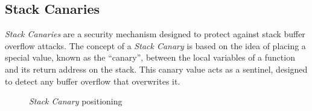 \subsection{Stack Canaries}
\label{subsec:background_canaries}

\textit{Stack Canaries} are a security mechanism designed to protect against
stack buffer overflow attacks. The concept of a \textit{Stack Canary} is based
on the idea of placing a special value, known as the ``canary'', between the
local variables of a function and its return address on the stack. This canary value
acts as a sentinel, designed to detect any buffer overflow that overwrites it.

\begin{figure}
  \centering
  \def\stackalignment{r} %
  {\scriptsize \parbox[t]{\linewidth}{}}
  \caption{\textit{Stack Canary} positioning}
  \label{fig:canary}
\end{figure}

